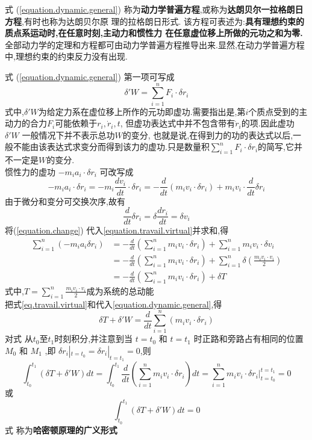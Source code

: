 \documentclass{book}
\begin{document}
式 (\ref{equation.dynamic.general})
称为\textbf{动力学普遍方程},或称为\textbf{达朗贝尔一拉格朗日方程},有时也称为达朗贝尔原 理的拉格朗日形式.
该方程可表述为:\textbf{具有理想约束的质点系运动时,在任意时刻,主动力和惯性力 在任意虚位移上所做的元功之和为零.}
全部动力学的定理和方程都可由动力学普遍方程推导出来.显然,在动力学普遍方程中,理想约束的约束反力没有出现.

式 (\ref{equation.dynamic.general})
第一项可写成
\begin{equation}
 \delta 'W=\sum_{i=1}^n F_i \cdot \delta r_i
 \label{eq.travail.virtual}
\end{equation}
式中,$\delta'W$为给定力系在虚位移上所作的元功即虚功.需要指出是,第$i$个质点受到的主动力的合力$F_i$可能依赖于$r_i,\dot{r}_i,t$,
但虚功表达式中并不包含带有$\dot{r}_i$的项.因此虚功$\delta 'W$ 一般情况下并不表示总功$W$的变分,
也就是说,在得到力的功的表达式以后,一般不能由该表达式求变分而得到该力的虚功.只是数量积$\sum_{i=1}^n F_i \cdot \delta r_i$的简写,它并不一定是$W$的变分. \\
惯性力的虚功 $ -m_ia_i\cdot \delta r_i $ 可改写成
\begin{equation}
-m_ia_i\cdot \delta r_i=-m_i \frac{dv_i}{dt} \cdot \delta r_i = - \frac{d}{dt}(m_i v_i \cdot \delta r_i) + m_i v_i \cdot \frac{d}{dt}\delta r_i
\label{equation.travail.virtual}
\end{equation}
由于微分和变分可交换次序,故有
\begin{equation}
 \frac{d}{dt}\delta r_i =\delta \frac{dr_i}{dt} =\delta v_i
 \label{equation.change}
\end{equation}
将(\ref{equation.change}) 代入\eqref{equation.travail.virtual}并求和,得
\begin{equation}
 \begin{split}
  \sum_{i=1}^n (-m_ia_i \delta r_i)& = -\frac{d}{dt}(\sum_{i=1}^n m_i v_i \cdot \delta r_i) + \sum_{i=1}^n m_i v_i\cdot \delta v_i\\
  & = -\frac{d}{dt}(\sum_{i=1}^n m_i v_i \cdot \delta r_i) + \sum_{i=1}^n \delta (\frac{m_i v_i \cdot v_i}{2}) \\
  & = -\frac{d}{dt}(\sum_{i=1}^n m_i v_i \cdot \delta r_i) + \delta T
 \end{split}
\end{equation}
式中,$T=\sum_{i=1}^n \frac{m_i v_i \cdot v_i}{2}$成为系统的总动能 \\
把式\eqref{eq.travail.virtual}和\lasteq 代入\eqref{equation.dynamic.general},得
\begin{equation}
 \delta T + \delta 'W =\frac{d}{dt}\sum_{i=1}^n (m_i v_i \cdot \delta r_i)
\end{equation}
对式 \lasteq 从$t_0$至$t_1$时刻积分,并注意到当 $t=t_0$ 和 $t=t_1$ 时正路和旁路占有相同的位置 $M_0$ 和 $M_1$ ,即
$ \delta r_i|_{t=t_0}= \delta r_i|_{t=t_1}= 0 $,则
\begin{equation}
\int_{t_0}^{t_1}(\delta T + \delta ' W)dt
= \int_{t_0}^{t_1}\frac{d}{dt}(\sum_{i=1}^n m_i v_i \cdot \delta r_i)dt
= \sum_{i=1}^n m_i v_i \cdot \delta r_i|_{t=t_0}^{t=t_1}
= 0
\end{equation}
或
\begin{equation}
 \int_{t_0}^{t_1}(\delta T + \delta ' W)dt=0
\end{equation}
式 \lasteq 称为\textbf{哈密顿原理的广义形式}
\end{document}
